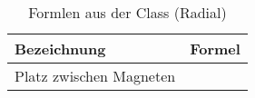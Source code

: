 \begin{table}[h!]

\centering
\caption{Formlen aus der Class (Radial)}
\label{tab:class.rad}
\renewcommand{\arraystretch}{2}
\setlength{\tabcolsep}{10mm}

\begin{tabular}{ll}
    \toprule
     Bezeichnung & Formel\\
    \midrule
	Platz zwischen Magneten&$\frac{}{}$\\
	
    \bottomrule
  \end{tabular}
\end{table}